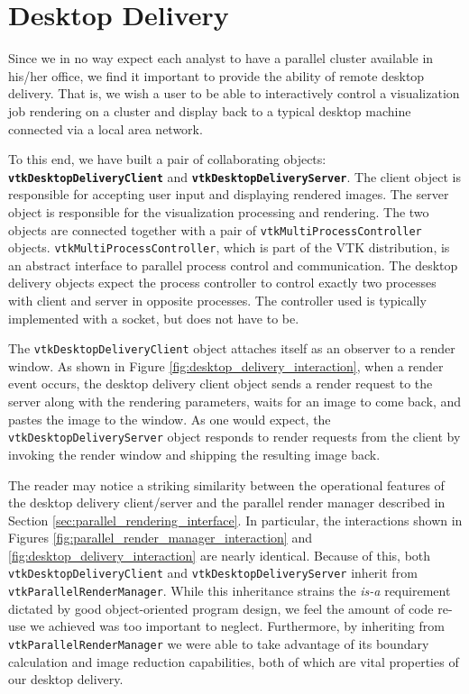 \documentclass{acmsiggraph}
\newcommand{\cidentifier}[1]{\texttt{#1}}
\newcommand{\keyterm}[1]{\textbf{#1}}
\begin{document}
  \section{Desktop Delivery}
  \label{sec:desktop_delivery}

  Since we in no way expect each analyst to have a parallel cluster
  available in his/her office, we find it important to provide the ability
  of remote desktop delivery.  That is, we wish a user to be able to
  interactively control a visualization job rendering on a cluster and
  display back to a typical desktop machine connected via a local area
  network.

  To this end, we have built a pair of collaborating objects:
  \keyterm{\cidentifier{vtk\-Desktop\-Delivery\-Client}} and
  \keyterm{\cidentifier{vtk\-Desktop\-Delivery\-Server}}.  The client
  object is responsible for accepting user input and displaying rendered
  images.  The server object is responsible for the visualization
  processing and rendering.  The two objects are connected together with a
  pair of \cidentifier{vtk\-Multi\-Process\-Controller} objects.
  \cidentifier{vtk\-Multi\-Process\-Controller}, which is part of the VTK
  distribution, is an abstract interface to parallel process control and
  communication.  The desktop delivery objects expect the process
  controller to control exactly two processes with client and server in
  opposite processes.  The controller used is typically implemented with a
  socket, but does not have to be.

  The \cidentifier{vtk\-Desktop\-Delivery\-Client} object attaches itself
  as an observer to a render window.  As shown in Figure
  \ref{fig:desktop_delivery_interaction}, when a render event occurs, the
  desktop delivery client object sends a render request to the server along
  with the rendering parameters, waits for an image to come back, and
  pastes the image to the window.  As one would expect, the
  \cidentifier{vtk\-Desktop\-Delivery\-Server} object responds to render
  requests from the client by invoking the render window and shipping the
  resulting image back.

  The reader may notice a striking similarity between the operational
  features of the desktop delivery client/server and the parallel render
  manager described in Section \ref{sec:parallel_rendering_interface}.  In
  particular, the interactions shown in Figures
  \ref{fig:parallel_render_manager_interaction} and
  \ref{fig:desktop_delivery_interaction} are nearly identical.  Because of
  this, both \cidentifier{vtk\-Desktop\-Delivery\-Client} and
  \cidentifier{vtk\-Desktop\-Delivery\-Server} inherit from
  \cidentifier{vtk\-Parallel\-Render\-Manager}.  While this inheritance
  strains the \emph{is-a} requirement dictated by good object-oriented program
  design, we feel the amount of code re-use we achieved was too important
  to neglect.  Furthermore, by inheriting from
  \cidentifier{vtk\-Parallel\-Render\-Manager} we were able to take
  advantage of its boundary calculation and image reduction capabilities,
  both of which are vital properties of our desktop delivery.
\end{document}

